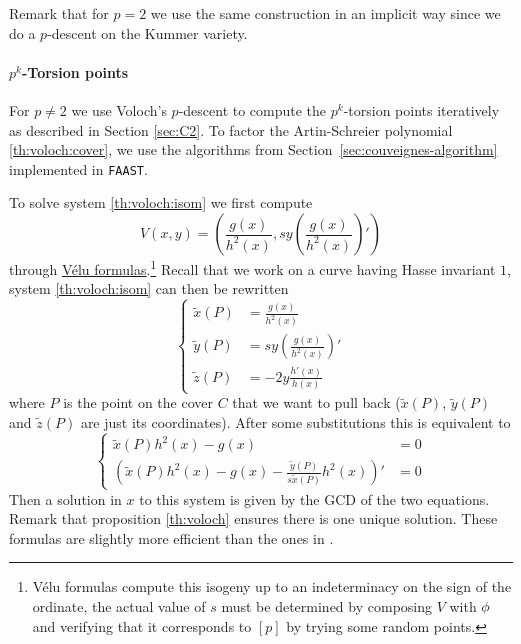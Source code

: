   Remark that
for $p=2$ we use the same construction in an implicit way since we do
a $p$-descent on the Kummer variety.


\paragraph{$p^k$-Torsion points}
For $p\ne2$ we use Voloch's $p$-descent to compute the $p^k$-torsion
points iteratively as described in Section \ref{sec:C2}. To factor the
Artin-Schreier polynomial \eqref{th:voloch:cover}, we use the
algorithms from Section~\ref{sec:couveignes-algorithm} implemented in
\texttt{FAAST}.

To solve system \eqref{th:voloch:isom} we first compute
\begin{equation*}
  V(x,y) = \left(\frac{g(x)}{h^2(x)}, 
    sy\left(\frac{g(x)}{h^2(x)}\right)'\right)
\end{equation*}
through \hyperref[sec:velu-formulas]{Vélu formulas}.\footnote{Vélu
  formulas compute this isogeny up to an indeterminacy on the sign of
  the ordinate, the actual value of $s$ must be determined by
  composing $V$ with $\phi$ and verifying that it corresponds to
  $[p]$ by trying some random points.} Recall that we work on a curve
having Hasse invariant $1$, system \eqref{th:voloch:isom} can then be
rewritten
\begin{equation*}
  \left\{
    \begin{aligned}
      \tilde{x}(P) &= \frac{g(x)}{h^2(x)}\\
      \tilde{y}(P) &= sy\left(\frac{g(x)}{h^2(x)}\right)'\\
      \tilde{z}(P) &= -2y\frac{h'(x)}{h(x)}
    \end{aligned}
  \right.
\end{equation*}
where $P$ is the point on the cover $C$ that we want to pull back
($\tilde{x}(P)$, $\tilde{y}(P)$ and $\tilde{z}(P)$ are just its
coordinates). After some substitutions this is equivalent to
\begin{equation*}
  \left\{
    \begin{aligned}
      \tilde{x}(P)h^2(x) - g(x) &= 0\\
      \left(\tilde{x}(P)h^2(x) - g(x) - \frac{\tilde{y}(P)}{s\tilde{x}(P)}h^2(x)\right)' &= 0
    \end{aligned}
  \right.
\end{equation*}
Then a solution in $x$ to this system is given by the GCD of the two
equations. Remark that proposition \ref{th:voloch} ensures there is
one unique solution. These formulas are slightly more efficient than
the ones in \cite[$\S$6.2]{lercier-algorithmique}.

